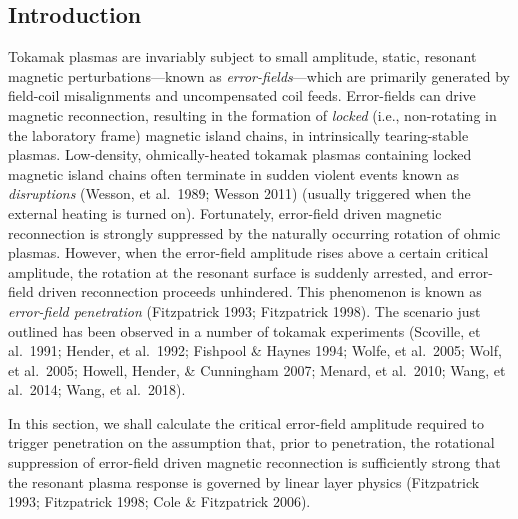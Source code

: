 \documentclass[notitlepage,12pt]{article}
\begin{document}
\subsection{Introduction}
Tokamak plasmas are invariably subject to small amplitude, static, resonant magnetic pert\-urbations---known as
{\em error-fields}---which are primarily generated by field-coil misalignments and uncompensated coil feeds. 
Error-fields can drive magnetic reconnection, resulting in the formation of {\em locked}\/ (i.e., non-rotating in the laboratory
frame) magnetic island chains, in intrinsically tearing-stable plasmas. Low-density, ohmically-heated tokamak plasmas
containing locked magnetic island chains often terminate in sudden violent events known as {\em disruptions}\/ (Wesson, et al.\ 1989; Wesson 2011) (usually triggered when the
external heating is turned on). Fortunately, error-field driven magnetic reconnection is strongly
suppressed by the naturally occurring rotation of ohmic plasmas. However, when the error-field amplitude rises
above a certain critical amplitude, the rotation at the resonant surface is suddenly arrested, and error-field driven reconnection proceeds
unhindered. This phenomenon is known as {\em error-field penetration}\/ (Fitzpatrick 1993; Fitzpatrick 1998). The scenario
just outlined has been observed in a number of tokamak experiments (Scoville, et al.\ 1991; Hender, et al.\ 1992; Fishpool
\& Haynes 1994; Wolfe, et al.\ 2005; Wolf, et al.\ 2005; Howell, Hender, \& Cunningham 2007; Menard, et al.\ 2010; Wang, et al.\ 2014; Wang, et al.\ 2018).

In this section, we shall calculate the critical error-field amplitude required to trigger penetration on the assumption that,
prior to penetration, the rotational suppression of error-field driven magnetic reconnection is sufficiently strong that
the resonant plasma response is governed by linear layer physics (Fitzpatrick 1993; Fitzpatrick 1998; Cole \& Fitzpatrick 2006).
\end{document}
